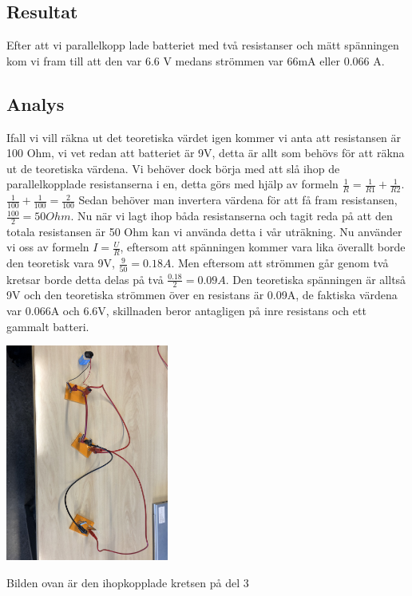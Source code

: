 \documentclass[11p]{article}
\begin{document}
    \subsection{Resultat}
    Efter att vi parallelkopp   lade batteriet med två resistanser och mätt spänningen kom vi fram till att den var 6.6 V medans strömmen var 66mA eller 0.066 A.
    \subsection{Analys}
    Ifall vi vill räkna ut det teoretiska värdet igen kommer vi anta att resistansen är 100 Ohm, vi vet redan att batteriet är 9V, detta är allt som behövs för att räkna ut de teoretiska värdena.
    Vi behöver dock börja med att slå ihop de parallelkopplade resistanserna i en, detta görs med hjälp av formeln $\frac{1}{R} = \frac{1}{R1} + \frac{1}{R2}$. $\frac{1}{100}+\frac{1}{100}=\frac{2}{100}$ Sedan behöver man invertera värdena för att få fram resistansen, $\frac{100}{2}=50 Ohm$.
    Nu när vi lagt ihop båda resistanserna och tagit reda på att den totala resistansen är 50 Ohm kan vi använda detta i vår uträkning.
    Nu använder vi oss av formeln $I = \frac{U}{R} $, eftersom att spänningen kommer vara lika överallt borde den teoretisk vara 9V,
    $\frac{9}{50}=0.18 A $. Men eftersom att strömmen går genom två kretsar borde detta delas på två $\frac{0.18}{2}= 0.09 A $.
    Den teoretiska spänningen är alltså 9V och den teoretiska strömmen över en resistans är 0.09A, de faktiska värdena var
    0.066A och 6.6V, skillnaden beror antagligen på inre resistans och ett gammalt batteri.

    \includegraphics[width=0.4\textwidth]{../images/LabbDel3.jpg}

    Bilden ovan är den ihopkopplade kretsen på del 3
\end{document}
